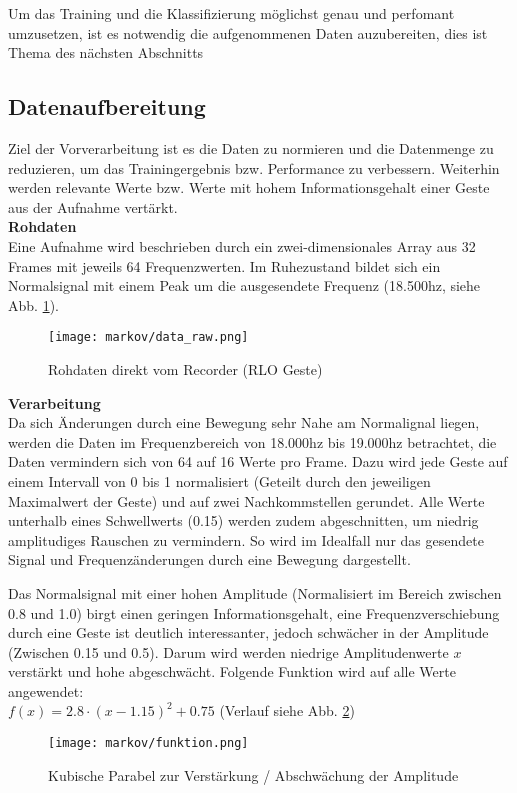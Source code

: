 Um das Training und die Klassifizierung möglichst genau und perfomant umzusetzen, 
ist es notwendig die aufgenommenen Daten auzubereiten, dies ist Thema des nächsten Abschnitts


\subsection{Datenaufbereitung} \label{sec:preproc}
Ziel der Vorverarbeitung ist es die Daten zu normieren und die Datenmenge zu reduzieren, um das Trainingergebnis bzw. Performance zu verbessern.
Weiterhin werden relevante Werte bzw. Werte mit hohem Informationsgehalt einer Geste aus der Aufnahme vertärkt. \\


\textbf{Rohdaten} \\
Eine Aufnahme wird beschrieben durch ein zwei-dimensionales Array aus 32 Frames mit jeweils 64 Frequenzwerten.
Im Ruhezustand bildet sich ein Normalsignal mit einem Peak um die ausgesendete Frequenz (18.500hz, siehe Abb. \ref{fig:data_raw}).

\begin{figure}[htbp] \centering
    \texttt{[image: markov/data\_raw.png]}
    \caption{Rohdaten direkt vom Recorder (\acl{RLO} Geste)}
    \label{fig:data_raw}
\end{figure}

\textbf{Verarbeitung}\\
Da sich Änderungen durch eine Bewegung sehr Nahe am Normalignal liegen, werden die Daten im 
Frequenzbereich von 18.000hz bis 19.000hz betrachtet, die Daten vermindern sich von 64 auf 16 Werte pro Frame. 
Dazu wird jede Geste auf einem Intervall von 0 bis 1 normalisiert (Geteilt durch den jeweiligen Maximalwert der Geste) und 
auf zwei Nachkommstellen gerundet. 
Alle Werte unterhalb eines Schwellwerts (0.15) werden zudem abgeschnitten, um niedrig amplitudiges Rauschen zu vermindern. 
So wird im Idealfall nur das gesendete Signal und Frequenzänderungen durch eine Bewegung dargestellt.

Das Normalsignal mit einer hohen Amplitude (Normalisiert im Bereich zwischen 0.8 und 1.0) birgt einen geringen Informationsgehalt, 
eine Frequenzverschiebung durch eine Geste ist deutlich interessanter, jedoch schwächer in der Amplitude (Zwischen 0.15 und 0.5).
Darum wird werden niedrige Amplitudenwerte \( x \) verstärkt und hohe abgeschwächt. Folgende Funktion wird auf alle Werte angewendet: \\
\( f(x) = 2.8 \cdot ( x - 1.15 )^2 + 0.75 \) (Verlauf siehe Abb. \ref{fig:funktion})
\begin{figure}[htbp] \centering
    \texttt{[image: markov/funktion.png]}
    \caption{Kubische Parabel zur Verstärkung / Abschwächung der Amplitude}
    \label{fig:funktion}
\end{figure}

